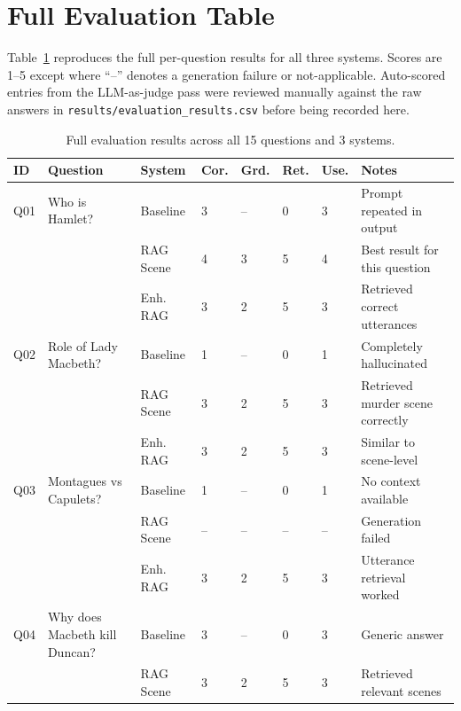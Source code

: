 \documentclass[10pt,conference]{IEEEtran}
\begin{document}
\appendices

\section{Full Evaluation Table}
\label{app:eval-table}

Table~\ref{tab:full-eval} reproduces the full per-question results
for all three systems. Scores are 1--5 except where ``--'' denotes a
generation failure or not-applicable. Auto-scored entries from the
LLM-as-judge pass were reviewed manually against the raw answers in
\texttt{results/evaluation\_results.csv} before being recorded here.

\begin{table}[p]
\centering
\caption{Full evaluation results across all 15 questions and 3 systems.}
\label{tab:full-eval}
\begin{tabularx}{\textwidth}{p{0.6cm} p{4cm} p{2.2cm} p{0.8cm} p{0.8cm} p{0.8cm} p{0.8cm} X}
\toprule
ID & Question & System & Cor. & Grd. & Ret. & Use. & Notes \\
\midrule
Q01 & Who is Hamlet? & Baseline & 3 & -- & 0 & 3 & Prompt repeated in output \\
    &                & RAG Scene & 4 & 3 & 5 & 4 & Best result for this question \\
    &                & Enh. RAG  & 3 & 2 & 5 & 3 & Retrieved correct utterances \\
\midrule
Q02 & Role of Lady Macbeth? & Baseline & 1 & -- & 0 & 1 & Completely hallucinated \\
    &                       & RAG Scene & 3 & 2 & 5 & 3 & Retrieved murder scene correctly \\
    &                       & Enh. RAG  & 3 & 2 & 5 & 3 & Similar to scene-level \\
\midrule
Q03 & Montagues vs Capulets? & Baseline & 1 & -- & 0 & 1 & No context available \\
    &                        & RAG Scene & -- & -- & -- & -- & Generation failed \\
    &                        & Enh. RAG  & 3 & 2 & 5 & 3 & Utterance retrieval worked \\
\midrule
Q04 & Why does Macbeth kill Duncan? & Baseline & 3 & -- & 0 & 3 & Generic answer \\
    &                               & RAG Scene & 3 & 2 & 5 & 3 & Retrieved relevant scenes \\

\end{tabularx}
\end{table}
\end{document}

